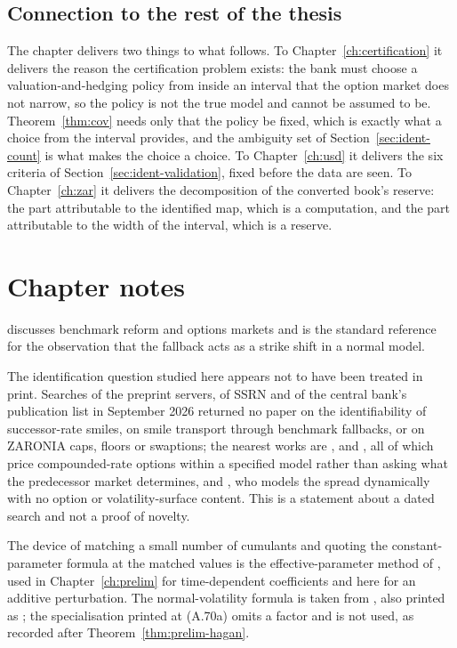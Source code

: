 \documentclass[../../../main.tex]{subfiles}
\begin{document}
\subsection{Connection to the rest of the thesis}

The chapter delivers two things to what follows. To Chapter~\ref{ch:certification} it delivers the reason the certification problem exists: the bank must choose a valuation-and-hedging policy from inside an interval that the option market does not narrow, so the policy is not the true model and cannot be assumed to be. Theorem~\ref{thm:cov} needs only that the policy be fixed, which is exactly what a choice from the interval provides, and the ambiguity set of Section~\ref{sec:ident-count} is what makes the choice a choice. To Chapter~\ref{ch:usd} it delivers the six criteria of Section~\ref{sec:ident-validation}, fixed before the data are seen. To Chapter~\ref{ch:zar} it delivers the decomposition of the converted book's reserve: the part attributable to the identified map, which is a computation, and the part attributable to the width of the interval, which is a reserve.

\section*{Chapter notes}

\citet{piterbarg2020} discusses benchmark reform and options markets and is the standard reference for the observation that the fallback acts as a strike shift in a normal model.

The identification question studied here appears not to have been treated in print. Searches of the preprint servers, of SSRN and of the central bank's publication list in September 2026 returned no paper on the identifiability of successor-rate smiles, on smile transport through benchmark fallbacks, or on ZARONIA caps, floors or swaptions; the nearest works are \citet{willems2020}, \citet{piterbarg2020} and \citet{lyashenko2019,lyashenko2020}, all of which price compounded-rate options within a specified model rather than asking what the predecessor market determines, and \citet{alfeus2026}, who models the spread dynamically with no option or volatility-surface content. This is a statement about a dated search and not a proof of novelty.

The device of matching a small number of cumulants and quoting the constant-parameter formula at the matched values is the effective-parameter method of \citet[App.~B]{hagan2002}, used in Chapter~\ref{ch:prelim} for time-dependent coefficients and here for an additive perturbation. The normal-volatility formula is taken from \citet[eq.~(A.67a) with $\beta=0$]{hagan2002}, also printed as \citet[eq.~(A.69a)]{hagan2002}; the specialisation printed at (A.70a) omits a factor and is not used, as recorded after Theorem~\ref{thm:prelim-hagan}.
\end{document}
